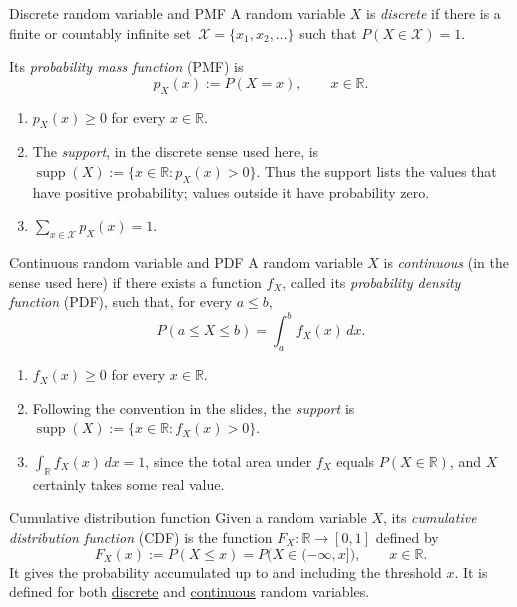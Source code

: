 \documentclass[12pt,a4paper,oneside]{report}
\begin{document}
\begingroup
\renewcommand{\thefootnote}{\fnsymbol{footnote}}
\endgroup
\nopagebreak
\begin{frameddefn}{Discrete random variable and PMF}
\label{def:discrete-pmf}
A random variable $X$ is \emph{discrete} if there is a finite or
countably infinite set\begingroup\renewcommand{\thefootnote}{\fnsymbol{footnote}}\footnotemark[3]\endgroup\ 
$\mathcal X=\{x_1,x_2,\ldots\}$ such that
$P(X\in\mathcal X)=1$.

Its \emph{probability mass function} (PMF) is
\[
  p_X(x):=P(X=x),\qquad x\in\mathbb R.
\]
\begin{enumerate}
  \item $p_X(x)\geq0$ for every $x\in\mathbb R$.
  \item The \emph{support}, in the discrete sense used here, is
    $\operatorname{supp}(X):=\{x\in\mathbb R:p_X(x)>0\}$.
    Thus the support lists the values that have positive probability;
    values outside it have probability zero.
  \item $\displaystyle\sum_{x\in\mathcal X}p_X(x)=1$.
\end{enumerate}
\end{frameddefn}

\begin{frameddefn}{Continuous random variable and PDF}
\label{def:continuous-pdf}
A random variable $X$ is \emph{continuous} (in the sense used here)
if there exists a function $f_X$, called its \emph{probability density
function} (PDF), such that, for every $a\leq b$,
\[
  P(a\leq X\leq b)=\int_a^b f_X(x)\,dx.
\]
\begin{enumerate}
  \item $f_X(x)\geq0$ for every $x\in\mathbb R$.
  \item Following the convention in the slides, the \emph{support} is
    $\operatorname{supp}(X):=\{x\in\mathbb R:f_X(x)>0\}$.
  \item $\displaystyle\int_{\mathbb R}f_X(x)\,dx=1$, since the total
    area under $f_X$ equals $P(X\in\mathbb R)$, and $X$ certainly
    takes some real value.
\end{enumerate}
\end{frameddefn}

\begin{frameddefn}{Cumulative distribution function}
\label{def:cdf}
Given a random variable $X$, its \emph{cumulative distribution
function} (CDF) is the function $F_X:\mathbb R\to[0,1]$ defined by
\[
  F_X(x):=P(X\leq x)=P\bigl(X\in(-\infty,x]\bigr),
  \qquad x\in\mathbb R.
\]
It gives the probability accumulated up to and including the
threshold $x$. It is defined for both
\hyperref[def:discrete-pmf]{discrete} and
\hyperref[def:continuous-pdf]{continuous} random variables.
\end{frameddefn}
\end{document}
